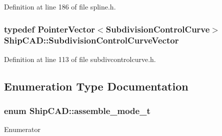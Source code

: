 Definition at line 186 of file spline.\-h.

\hypertarget{namespaceShipCAD_aa9dd7a826ae5254e377dac43ea19da80}{
\subsubsection[{Subdivision\-Control\-Curve\-Vector}]{\setlength{\rightskip}{0pt plus 5cm}typedef {\bf Pointer\-Vector}$<${\bf Subdivision\-Control\-Curve}$>$ {\bf Ship\-C\-A\-D\-::\-Subdivision\-Control\-Curve\-Vector}}}\label{namespaceShipCAD_aa9dd7a826ae5254e377dac43ea19da80}


Definition at line 113 of file subdivcontrolcurve.\-h.



\subsection{Enumeration Type Documentation}
\hypertarget{namespaceShipCAD_aaba70dc1c80dc540bef320cb9b720a20}{
\subsubsection[{assemble\-\_\-mode\-\_\-t}]{\setlength{\rightskip}{0pt plus 5cm}enum {\bf Ship\-C\-A\-D\-::assemble\-\_\-mode\-\_\-t}}}\label{namespaceShipCAD_aaba70dc1c80dc540bef320cb9b720a20}
\begin{Desc}
\item[Enumerator]\par
\begin{description}
\item[{\em 
\hypertarget{namespaceShipCAD_aaba70dc1c80dc540bef320cb9b720a20aeaaf4833473e9e7c408d2f02c7d112c6}{am\-Regular}\label{namespaceShipCAD_aaba70dc1c80dc540bef320cb9b720a20aeaaf4833473e9e7c408d2f02c7d112c6}
}]\item[{\em 
\hypertarget{namespaceShipCAD_aaba70dc1c80dc540bef320cb9b720a20a33b807b55bc385bc5d69ceb0d74d53fc}{am\-N\-U\-R\-B\-S}\label{namespaceShipCAD_aaba70dc1c80dc540bef320cb9b720a20a33b807b55bc385bc5d69ceb0d74d53fc}
}]\end{description}
\end{Desc}


